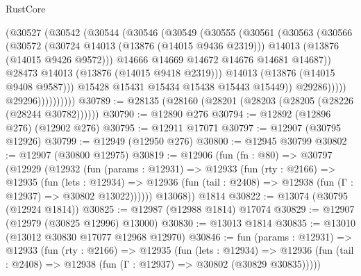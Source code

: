 \begin{lexlean}{RustCore}
\begin{coremodule}
                            (@30527
                              (@30542
                                (@30544
                                  (@30546
                                    (@30549
                                      (@30555
                                        (@30561
                                          (@30563
                                            (@30566
                                              (@30572
                                                (@30724 @14013 (@13876 (@14015 @9436 @2319)))
                                                @14013
                                                (@13876 (@14015 @9426 @9572)))
                                              @14666
                                              @14669
                                              @14672
                                              @14676
                                              @14681
                                              @14687))
                                          @28473
                                          @14013
                                          (@13876 (@14015 @9418 @2319)))
                                        @14013
                                        (@13876 (@14015 @9408 @9587)))
                                      @15428
                                      @15431
                                      @15434
                                      @15438
                                      @15443
                                      @15449))
                                  @29286)))))
                        @29296))))))))))
@30789 := @28135 (@28160 (@28201 (@28203 (@28205 (@28226 (@28244 @30782))))))
@30790 := @12890 @276
@30794 := @12892 (@12896 @276) (@12902 @276)
@30795 := @12911 @17071
@30797 := @12907 (@30795 @12926)
@30799 := @12949 (@12950 @276)
@30800 := @12945 @30799
@30802 := @12907 (@30800 @12975)
@30819 := @12906
    (fun (fn : @80) =>
    @30797
      (@12929
        (@12932
          (fun (params : @12931) =>
          @12933
            (fun (rty : @2166) =>
            @12935
              (fun (lets : @12934) =>
              @12936 (fun (tail : @2408) => @12938 (fun (Γ : @12937) => @30802 @13022))))))
        @13068))
    @1814
@30822 := @13074 (@30795 (@12924 @1814))
@30825 := @12987 (@12988 @1814) @17074
@30829 := @12907 (@12979 (@30825 @12996) @13000)
@30830 := @13013 @1814
@30835 := @13010 (@13012 @30830 @17077 @12968 @12970)
@30846 := fun (params : @12931) =>
  @12933
    (fun (rty : @2166) =>
    @12935
      (fun (lets : @12934) =>
      @12936 (fun (tail : @2408) => @12938 (fun (Γ : @12937) => @30802 (@30829 @30835)))))

\end{coremodule}
\end{lexlean}

